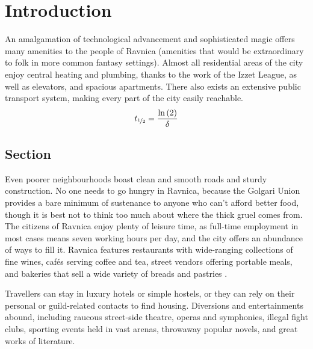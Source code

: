 \chapter{Introduction}
An amalgamation of technological advancement and sophisticated magic offers many 
amenities to the people of Ravnica (amenities that would be extraordinary to
folk in more common fantasy settings). Almost all residential areas of the city
enjoy central heating and plumbing, thanks to the work of the Izzet League, as
well as elevators, and spacious apartments. There also exists an extensive
public transport system, making every part of the city easily reachable.
\begin{align*}
t_{\nicefrac{1}{2}}=\frac{\ln\left(2\right)}{\delta}
\end{align*}

\section{Section}
Even poorer neighbourhoods boast clean and smooth roads and sturdy construction.
No one needs to go hungry in Ravnica, because the Golgari Union provides a bare
minimum of  sustenance to anyone who can't afford better food, though it is best
not to think too much about where the thick gruel comes from. The citizens of
Ravnica enjoy plenty of leisure time, as full-time employment in most cases
means seven working hours per day, and the city offers an abundance of ways to
fill it. Ravnica features restaurants with wide-ranging collections of fine
wines, cafés serving coffee and tea, street vendors offering portable meals, and
bakeries that sell a wide variety of breads and pastries \citep{Reich2013}.

Travellers can stay in luxury hotels or simple hostels, or they can rely on
their personal or guild-related contacts to find housing. 
Diversions and entertainments abound, including raucous street-side theatre,
operas and symphonies, illegal fight clubs, sporting events held in vast
arenas, throwaway popular novels, and great works of literature.

